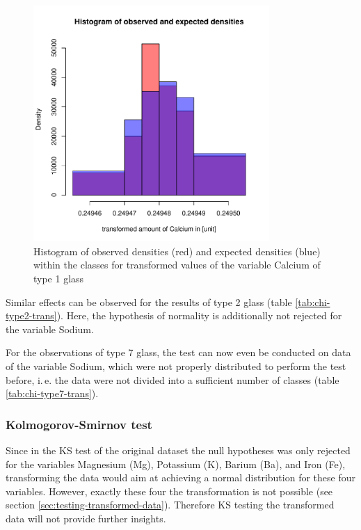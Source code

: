 \documentclass[a4paper, 12pt, titlepage, headsepline, listof = totoc, bibliography = totoc, numbers = noenddot]{scrartcl}
\newcommand{\ie}{i.\,e. }
\begin{document}
\begin{figure}[h!]
\centering
\includegraphics[width=0.8\textwidth]{report-chisqType1CaTrans}
\caption{Histogram of observed densities (red) and expected densities (blue) within the classes for transformed values of the variable Calcium of type 1 glass}
\label{fig:chisqType1CaTrans}
\end{figure}



Similar effects can be observed for the results of type 2 glass (table \ref{tab:chi-type2-trans}). Here, the hypothesis of normality is additionally not rejected for the variable Sodium.


For the observations of type 7 glass, the test can now even be conducted on data of the variable Sodium, which were not properly distributed to perform the test before, \ie the data were not divided into a sufficient number of classes (table \ref{tab:chi-type7-trans}).

\subsubsection{Kolmogorov-Smirnov test}

Since in the KS test of the original dataset the null hypotheses was only rejected for the variables Magnesium (Mg), Potassium (K), Barium (Ba), and Iron (Fe), transforming the data would aim at achieving a normal distribution for these four variables. However, exactly these four the transformation is not possible (see section \ref{sec:testing-transformed-data}). Therefore KS testing the transformed data will not provide further insights.
\end{document}

